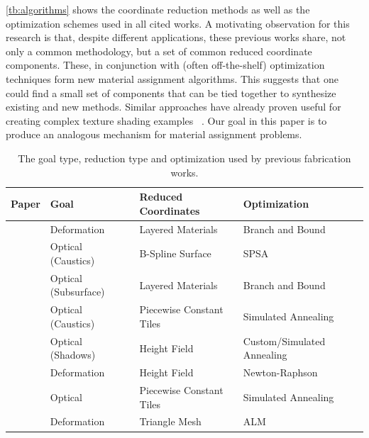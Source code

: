 \documentclass[annual]{acmsiggraph}
\begin{document}
\autoref{tb:algorithms} shows the coordinate reduction methods as well as the optimization schemes used in all cited works. A motivating observation for this research is that, despite different applications, these previous works share, not only a common methodology, but a set of common reduced coordinate components. These, in conjunction with (often off-the-shelf) optimization techniques form new material assignment algorithms. This suggests that one could find a small set of components that can be tied together to synthesize existing and new methods. Similar approaches have already proven useful for creating complex texture shading examples ~\cite{Cook1984}. Our goal in this paper is to produce an analogous mechanism for material assignment problems. 
\begin{table}[htp]
\centering
\caption{The goal type, reduction type and optimization used by previous fabrication works.}
\begin{tabular}{clll}
\hline
\textbf{Paper} & \textbf{Goal} & \textbf{Reduced Coordinates}  & \textbf{Optimization} \\ 
\hline
~\cite{Bickel:2010}& Deformation & Layered Materials  & Branch and Bound \\
~\cite{Finckh:2010} & Optical (Caustics) & B-Spline Surface & SPSA \\
~\cite{Hasan:2010}& Optical (Subsurface) & Layered Materials & Branch and Bound\\ 
~\cite{Marios:2011} & Optical (Caustics) & Piecewise Constant Tiles & Simulated Annealing \\
~\cite{Bermano:2012} & Optical (Shadows) & Height Field & Custom/Simulated Annealing \\
~\cite{Bickel:2012} & Deformation &  Height Field &  Newton-Raphson \\
~\cite{Papas:2012} & Optical & Piecewise Constant Tiles & Simulated Annealing \\
~\cite{sko:2012}& Deformation & Triangle Mesh & ALM \\
\hline
\end{tabular}
\label{tb:algorithms}
\end{table}
\end{document}
